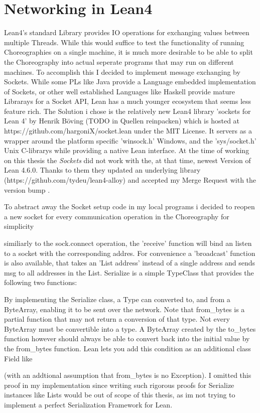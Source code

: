 \section{Networking in Lean4}
Lean4's standard Library provides IO operations for exchanging values between multiple Threads. While this would suffice to test the functionality of running Choreographies on a single machine, it is much more desirable to be able to split the Choreography into actual seperate programs that may run on different machines. To accomplish this I decided to implement message exchanging by Sockets.
While some PLs like Java provide a Language embedded implementation of Sockets, or other well established Languages like Haskell provide mature Librarays for a Socket API, Lean has a much younger ecosystem that seems less feature rich. The Solution i chose is the relatively new Lean4 library 'sockets for Lean 4' by Henrik Böving (TODO in Quellen reinpacken) which is hosted at https://github.com/hargoniX/socket.lean under the MIT License. It servers as a wrapper around the platform specific 'winsock.h' Windows, and the 'sys/socket.h' Unix C-librarys while providing a native Lean interface. At the time of working on this thesis the \emph{Sockets} did not work with the, at that time, newest Version of Lean 4.6.0. Thanks to them they updated an underlying library (https://github.com/tydeu/lean4-alloy) and accepted my Merge Request with the version bump \cite{test}.
\par
To abstract away the Socket setup code in my local programs i decided to reopen a new socket for every communication operation in the Choreography for simplicity



similiarly to the sock.connect operation, the 'receive' function will bind an listen to a socket with the corresponding addres. For convenience a 'broadcast' function is also available, that takes an 'List address' instead of a single address and sends msg to all addresses in the List.
\newline
Serialize is a simple TypeClass that provides the following two functions:

By implementing the Serialize class, a Type can converted to, and from a ByteArray, enabling it to be sent over the network. Note that from_bytes is a partial function that may not return a conversion of that type. Not every ByteArray must be convertible into a type. A ByteArray created by the to_bytes function however should always be able to convert back into the initial value by the from_bytes function. Lean lets you add this condition as an additional class Field like

(with an addtional assumption that from_bytes is no Exception). I omitted this proof in my implementation since writing such rigorous proofs for Serialize instances like Lists would be out of scope of this thesis, as im not trying to implement a perfect Serialization Framework for Lean.

